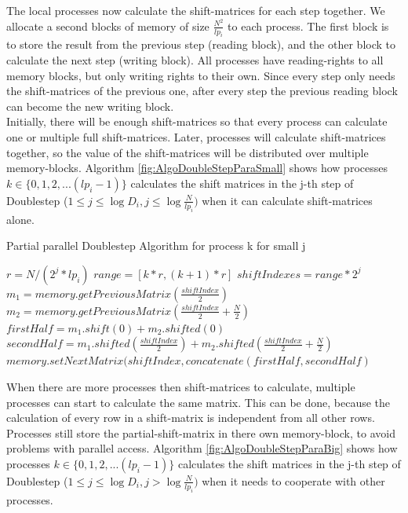 \documentclass[12pt]{article}
\begin{document}
The local processes now calculate the shift-matrices for each step together. We allocate a second blocks of memory of size $\frac{N^2}{lp_i}$ to each process. The first block is to store the result from the previous step (reading block), and the other block to calculate the next step (writing block). All processes have reading-rights to all memory blocks, but only writing rights to their own. Since every step only needs the shift-matrices of the previous one, after every step the previous reading block can become the new writing block.\\

Initially, there will be enough shift-matrices so that every process can calculate one or multiple full shift-matrices. Later, processes will calculate shift-matrices together, so the value of the shift-matrices will be distributed over multiple memory-blocks. Algorithm \ref{fig:AlgoDoubleStepParaSmall} shows how processes  $k\in \{0,1,2,...(lp_i-1)\}$ calculates the shift matrices in the j-th step of Doublestep ($1 \leq j\leq \log D_i,j\leq \log \frac{N}{lp_i})$ when it can calculate shift-matrices alone.\\

\begin{algorithm}
\caption{Partial parallel Doublestep Algorithm for process k for small j}\label{euclid}
\label{fig:AlgoDoubleStepParaSmall}
\begin{algorithmic}[1]
\State $r = N/(2^j*lp_i)$
\State $range = [k*r,(k+1)*r]$
\State $shiftIndexes = range*2^j$
      \State $m_1 = memory.getPreviousMatrix( \frac{shiftIndex}{2} )$
      \State $m_2 = memory.getPreviousMatrix( \frac{shiftIndex}{2}+\frac{N}{2} )$
      \State $firstHalf = m_1.shift(0) + m_2.shifted(0)$
      \State $secondHalf = m_1.shifted(\frac{shiftIndex}{2}) + m_2.shifted(\frac{shiftIndex}{2}+\frac{N}{2})$
      \State $memory.setNextMatrix( shiftIndex, concatenate(firstHalf,secondHalf)$
\EndFor
\end{algorithmic}
\end{algorithm}

When there are more processes then shift-matrices to calculate, multiple processes can start to calculate the same matrix. This can be done, because the calculation of every row in a shift-matrix is independent from all other rows. Processes still store the partial-shift-matrix in there own memory-block, to avoid problems with parallel access.  Algorithm \ref{fig:AlgoDoubleStepParaBig} shows how processes  $k\in \{0,1,2,...(lp_i-1)\}$ calculates the shift matrices in the j-th step of Doublestep ($1 \leq j\leq \log D_i,j> \log \frac{N}{lp_i})$ when it needs to cooperate with other processes.\\
\end{document}
